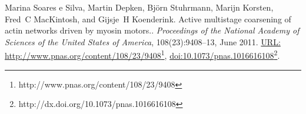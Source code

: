 \documentclass[A4paperpaper,11pt,english]{sphinxmanual}
\begin{document}
\begin{thebibliography}{Nieminen, Knoner, Heckenberg, RubinszteinDunlop,  2007}
{Marina Soares e Silva, Martin Depken, Björn Stuhrmann, Marijn Korsten, Fred C MacKintosh, and Gijsje H Koenderink. Active multistage coarsening of actin networks driven by myosin motors.. \emph{Proceedings of the National Academy of Sciences of the United States of America}, 108(23):9408–13, June 2011. \href{http://www.pnas.org/content/108/23/9408}{URL: http://www.pnas.org/content/108/23/9408}\footnote{http://www.pnas.org/content/108/23/9408}, \href{http://dx.doi.org/10.1073/pnas.1016616108}{doi:10.1073/pnas.1016616108}\footnote{http://dx.doi.org/10.1073/pnas.1016616108}.
}
\end{thebibliography}



\renewcommand{\indexname}{Index}
\printindex
\end{document}
